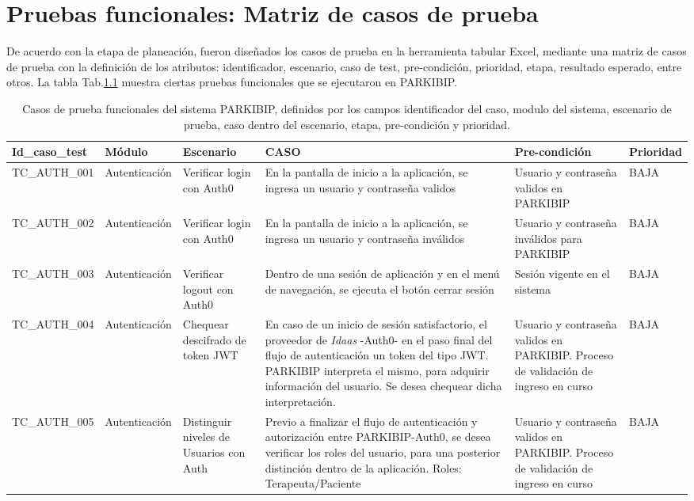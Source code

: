 \chapter{Pruebas funcionales: Matriz de casos de prueba}\label{apendice:tests-cases}

De acuerdo con la etapa de planeación, fueron diseñados los casos de prueba en la herramienta tabular Excel, mediante una matriz de casos de prueba con la definición de los atributos: identificador, escenario, caso de test, pre-condición, prioridad, etapa, resultado esperado, entre otros. La tabla Tab.\ref{tab:design-cases} muestra ciertas pruebas funcionales que se ejecutaron en PARKIBIP.

\fontsize{9}{11}\selectfont
\setlength\LTleft{-2.5cm}
\begin{longtable}{| p{2cm} | p{2cm}| p{2.5cm}| p{4.5cm}| p{3cm} | p{1.5cm}|}
\caption{Casos de prueba funcionales del sistema PARKIBIP, definidos por los campos identificador del caso, modulo del sistema, escenario de prueba, caso dentro del escenario, etapa, pre-condición	y prioridad.
}\\\hline
\label{tab:design-cases}
\textbf{Id\_caso\_test} & \textbf{Módulo}& \textbf{Escenario} &  \textbf{CASO} & \textbf{Pre-condición} & \textbf{Prioridad} \\ \hline
\endhead
TC\_AUTH\_001 & Autenticación  & Verificar login con Auth0 & En la pantalla de inicio a la aplicación, se ingresa un usuario y contraseña validos & Usuario y contraseña validos en PARKIBIP & BAJA \\ \hline
TC\_AUTH\_002 & Autenticación  & Verificar login con Auth0 & En la pantalla de inicio a la aplicación, se ingresa un usuario y contraseña inválidos & Usuario y contraseña inválidos para PARKIBIP & BAJA \\ \hline
TC\_AUTH\_003 & Autenticación  & Verificar logout con Auth0 & Dentro de una sesión de aplicación y en el menú de navegación, se ejecuta el botón cerrar sesión & Sesión vigente en el sistema & BAJA \\ \hline
TC\_AUTH\_004 & Autenticación  & Chequear descifrado de token JWT & En caso de un inicio de sesión satisfactorio, el proveedor de \textit{Idaas} -Auth0- en el paso final del flujo de autenticación un token del tipo JWT. PARKIBIP interpreta el mismo, para adquirir información del usuario. Se desea chequear dicha interpretación.  & Usuario y contraseña validos en PARKIBIP. Proceso de validación de ingreso en curso & BAJA \\ \hline
TC\_AUTH\_005 & Autenticación  & Distinguir niveles de Usuarios con Auth & Previo a finalizar el flujo de autenticación y autorización entre PARKIBIP-Auth0, se desea verificar los roles del usuario, para una posterior distinción dentro de la aplicación. Roles: Terapeuta/Paciente & Usuario y contraseña validos en PARKIBIP. Proceso de validación de ingreso en curso & BAJA \\ \hline

\end{longtable}
